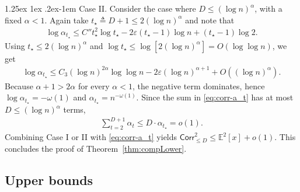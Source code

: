 \documentclass[12pt]{article}
\makeatletter
\newtheorem{definition}{Definition}
\newcommand{\Ind}{\mathbbm{1}}
\newcommand{\p}[1]{\left(#1\right)}
\newcommand{\s}[1]{\mathsf{#1}}
\renewcommand{\paragraph}{%
  \@startsection{paragraph}{4}%
  {\z@}{1.25ex \@plus 1ex \@minus .2ex}{-1em}%
  {\normalfont\normalsize\bfseries}%
}
\makeatother
\begin{document}
\paragraph{Case II.} Consider the case where $D\le(\log n)^{\alpha}$, with a fixed $\alpha<1$. Again take $t_\star\triangleq D+1\leq 2(\log n)^{\alpha}$ and note that
\begin{align}
\log \alpha_{t_\star}\leq C''t_\star^2\log t_\star-2\varepsilon(t_\star-1)\log n+(t_\star-1)\log 2.
\end{align}
Using $t_\star\leq 2(\log n)^{\alpha}$ and $\log t_\star\leq \log[2(\log n)^{\alpha}]=O(\log\log n)$, we get
\begin{align}
\log \alpha_{t_\star}\leq C_3(\log n)^{2\alpha}\log\log n-2\varepsilon(\log n)^{\alpha+1}+O\p{(\log n)^{\alpha}}.
\end{align}
Because $\alpha+1>2\alpha$ for every $\alpha<1$, the negative term dominates, hence $\log \alpha_{t_\star}=-\omega(1)$ and $\alpha_{t_\star}=n^{-\omega(1)}$. Since the sum in \eqref{eq:corr-a_t} has at most $D\le(\log n)^{\alpha}$ terms,
\begin{align}
\sum_{t=2}^{D+1} \alpha_t\leq D\cdot \alpha_{t_\star}=o(1).
\end{align}
Combining Case I or II with \eqref{eq:corr-a_t} yields $\s{Corr}_{\leq D}^2\leq \mathbb{E}^2[x]+o(1)$. This concludes the proof of Theorem~\ref{thm:compLower}.

\subsection{Upper bounds}

\end{document}
